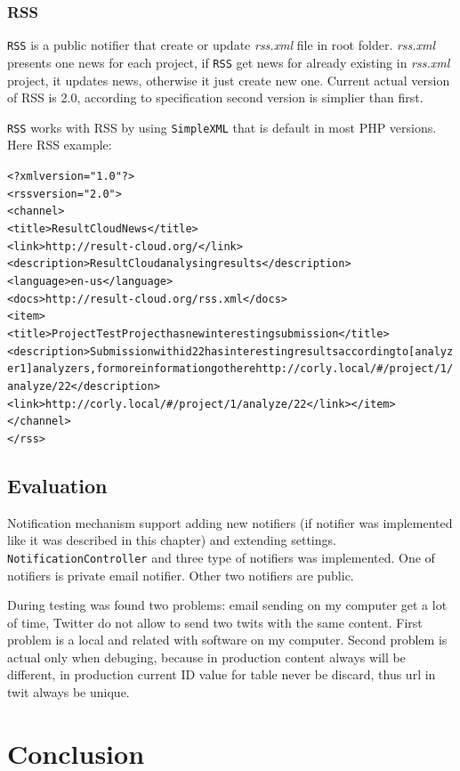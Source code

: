 \subsection{RSS}

\texttt{RSS} is a public notifier that create or update \emph{rss.xml} file in root folder. \emph{rss.xml} presents one news for each project, if \texttt{RSS} get news for already existing in \emph{rss.xml} project, it updates news, otherwise it just create new one. Current actual version of RSS is 2.0, according to specification \cite{rss} second version is simplier than first.

\texttt{RSS} works with RSS by using \texttt{SimpleXML} that is default in most PHP versions. Here RSS example:
\begin{alltt}
<?xml version="1.0"?>
<rss version="2.0"> 
<channel>
<title>ResultCloud News</title>
<link>http://result-cloud.org/</link>
<description>ResultCloud analysing results</description>
<language>en-us</language>
<docs>http://result-cloud.org/rss.xml</docs>
<item>
<title>Project TestProject has new interesting submission</title>
<description>Submission with id 22 has interesting results according to [analyzer1] analyzers, for more information go there http://corly.local/#/project/1/analyze/22</description>
<link>http://corly.local/#/project/1/analyze/22</link></item>
</channel>
</rss>

\end{alltt}

\section{Evaluation}

Notification mechanism support adding new notifiers (if notifier was implemented like it was described in this chapter) and extending settings. \texttt{NotificationController} and three type of notifiers was implemented. One of notifiers is private email notifier. Other two notifiers are public.

During testing was found two problems: email sending on my computer get a lot of time, Twitter do not allow to send two twits with the same content. First problem is a local and related with software on my computer. Second problem is actual only when debuging, because in production content always will be different, in production current ID value for table never be discard, thus url in twit always be unique. 

\chapter{Conclusion}
\label{ch:conclusion}

